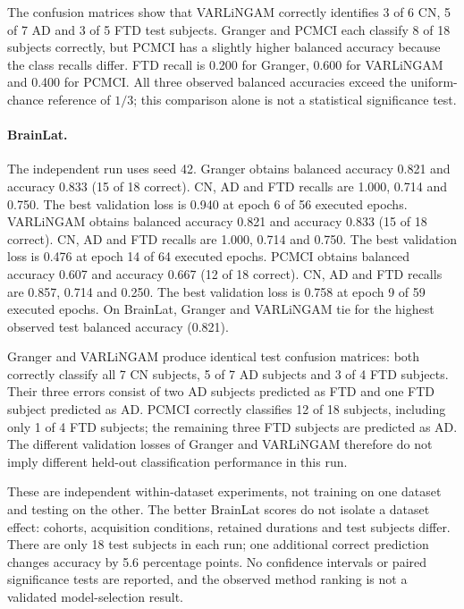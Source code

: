 \documentclass[11pt,a4paper]{article}
\begin{document}
The confusion matrices show that VARLiNGAM correctly identifies 3 of 6 CN,
5 of 7 AD and 3 of 5 FTD test subjects. Granger and PCMCI each classify
8 of 18 subjects correctly, but PCMCI has a slightly higher balanced
accuracy because the class recalls differ. FTD recall is 0.200 for
Granger, 0.600 for VARLiNGAM and 0.400 for PCMCI. All three observed
balanced accuracies exceed the uniform-chance reference of $1/3$;
this comparison alone is not a statistical significance test.

\paragraph{BrainLat.}
The independent run uses seed 42.
Granger obtains balanced accuracy 0.821 and accuracy 0.833 (15 of 18 correct). CN, AD and FTD recalls are 1.000, 0.714 and 0.750. The best validation loss is 0.940 at epoch 6 of 56 executed epochs.
VARLiNGAM obtains balanced accuracy 0.821 and accuracy 0.833 (15 of 18 correct). CN, AD and FTD recalls are 1.000, 0.714 and 0.750. The best validation loss is 0.476 at epoch 14 of 64 executed epochs.
PCMCI obtains balanced accuracy 0.607 and accuracy 0.667 (12 of 18 correct). CN, AD and FTD recalls are 0.857, 0.714 and 0.250. The best validation loss is 0.758 at epoch 9 of 59 executed epochs.
On BrainLat, Granger and VARLiNGAM tie for the highest observed test balanced accuracy (0.821).

Granger and VARLiNGAM produce identical test confusion matrices: both
correctly classify all 7 CN subjects, 5 of 7 AD subjects and 3 of 4 FTD
subjects. Their three errors consist of two AD subjects predicted as FTD
and one FTD subject predicted as AD. PCMCI correctly classifies 12 of 18
subjects, including only 1 of 4 FTD subjects; the remaining three FTD
subjects are predicted as AD. The different validation losses of Granger
and VARLiNGAM therefore do not imply different held-out classification
performance in this run.

These are independent within-dataset experiments, not training on one
dataset and testing on the other. The better BrainLat scores do not isolate
a dataset effect: cohorts, acquisition conditions, retained durations and
test subjects differ. There are only 18 test subjects in each run; one
additional correct prediction changes accuracy by 5.6 percentage points.
No confidence intervals or paired significance tests are reported, and the
observed method ranking is not a validated model-selection result.
\end{document}
